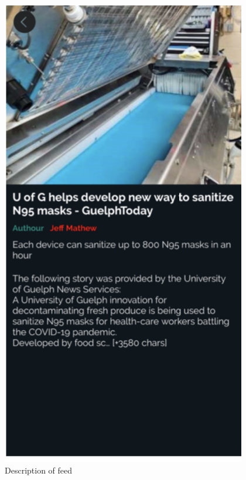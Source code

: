 \begin{center}
\includegraphics[scale=0.55]{desc.png}\\[0.75cm]
\caption{Description of feed}
\end{center}
